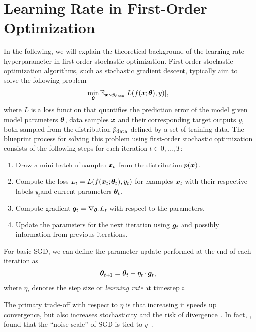 \documentclass{article} %
\begin{document}
\section{Learning Rate in First-Order Optimization}

In the following, we will explain the theoretical background of the learning rate hyperparameter in first-order stochastic optimization.
First-order stochastic optimization algorithms, such as stochastic gradient descent, typically aim to solve the following problem
\begin{equation}
   \min_{{\bm{\theta}}} \mathbb{E}_{{\bm{x}} \sim \hat{p}_{\rm{data}}} [L(f({\bm{x}}; {\bm{\theta}}), y)],
\end{equation}
where $L$ is a loss function that quantifies the prediction error of the model given model parameters ${\bm{\theta}}$, data samples ${\bm{x}}$ and their corresponding target outputs $y$, both sampled from the distribution $\hat{p}_{\rm{data}}$ defined by a set of training data.
The blueprint process for solving this problem using first-order stochastic optimization consists of the following steps for each iteration $t \in 0, \ldots, T$:
\begin{enumerate}
   \item Draw a mini-batch of samples ${\bm{x}}_t$ from the distribution $p({\bm{x}})$.
   \item Compute the loss $L_t = L(f({\bm{x}}_t; {\bm{\theta}}_t), y_t)$ for examples ${\bm{x}}_t$ with their respective labels $y_t$\footnotemark[1] and current parameters ${\bm{\theta}}_t$.
   \item Compute gradient ${\bm{g}}_t = \nabla_{{\bm{\theta}}_t} L_t$ with respect to the parameters.
   \item Update the parameters for the next iteration using ${\bm{g}}_t$ and possibly information from previous iterations.
\end{enumerate}


For basic SGD, we can define the parameter update performed at the end of each iteration as
\begin{equation}\label{eq:sgd_update}
   {\bm{\theta}}_{t+1}  = {\bm{\theta}}_{t} - \eta_t \cdot {\bm{g}}_t,
\end{equation}
where $\eta_t$ denotes the step size or \textit{learning rate} at timestep $t$.

The primary trade-off with respect to $\eta$ is that increasing it speeds up convergence, but also increases stochasticity and the risk of divergence~\citep{bengioPracticalRecommendationsGradientbased2012}.
In fact, \citet{smithBayesianPerspectiveGeneralization2018}, found that the “noise scale” of SGD is tied to $\eta$~\citep{smithBayesianPerspectiveGeneralization2018}.
\end{document}

